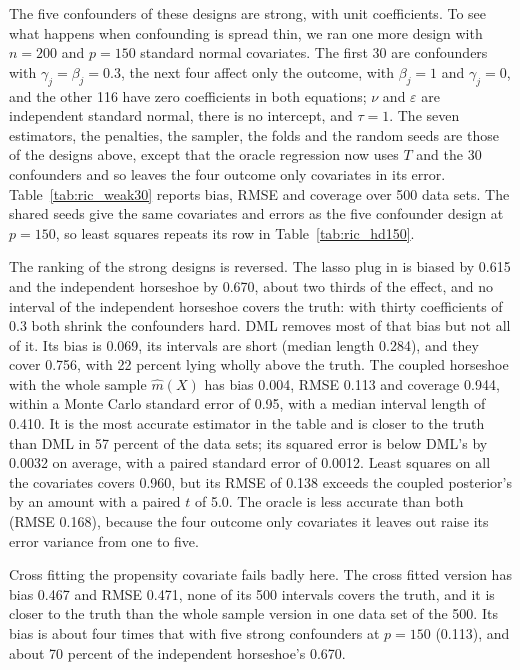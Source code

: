 The five confounders of these designs are strong, with unit coefficients. To see what happens when confounding is spread thin, we ran one more design with $n = 200$ and $p = 150$ standard normal covariates. The first 30 are confounders with $\gamma_j = \beta_j = 0.3$, the next four affect only the outcome, with $\beta_j = 1$ and $\gamma_j = 0$, and the other 116 have zero coefficients in both equations; $\nu$ and $\varepsilon$ are independent standard normal, there is no intercept, and $\tau = 1$. The seven estimators, the penalties, the sampler, the folds and the random seeds are those of the designs above, except that the oracle regression now uses $T$ and the 30 confounders and so leaves the four outcome only covariates in its error. Table~\ref{tab:ric_weak30} reports bias, RMSE and coverage over 500 data sets. The shared seeds give the same covariates and errors as the five confounder design at $p = 150$, so least squares repeats its row in Table~\ref{tab:ric_hd150}.



The ranking of the strong designs is reversed. The lasso plug in is biased by 0.615 and the independent horseshoe by 0.670, about two thirds of the effect, and no interval of the independent horseshoe covers the truth: with thirty coefficients of 0.3 both shrink the confounders hard. DML removes most of that bias but not all of it. Its bias is 0.069, its intervals are short (median length 0.284), and they cover 0.756, with 22 percent lying wholly above the truth. The coupled horseshoe with the whole sample $\hat m(X)$ has bias 0.004, RMSE 0.113 and coverage 0.944, within a Monte Carlo standard error of 0.95, with a median interval length of 0.410. It is the most accurate estimator in the table and is closer to the truth than DML in 57 percent of the data sets; its squared error is below DML's by 0.0032 on average, with a paired standard error of 0.0012. Least squares on all the covariates covers 0.960, but its RMSE of 0.138 exceeds the coupled posterior's by an amount with a paired $t$ of 5.0. The oracle is less accurate than both (RMSE 0.168), because the four outcome only covariates it leaves out raise its error variance from one to five.

Cross fitting the propensity covariate fails badly here. The cross fitted version has bias 0.467 and RMSE 0.471, none of its 500 intervals covers the truth, and it is closer to the truth than the whole sample version in one data set of the 500. Its bias is about four times that with five strong confounders at $p = 150$ (0.113), and about 70 percent of the independent horseshoe's 0.670.

